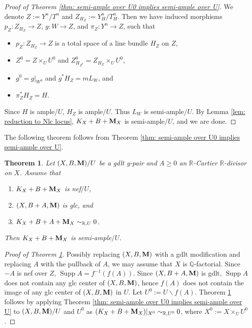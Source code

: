 \documentclass[11pt]{amsart}
\numberwithin{equation}{section}
\newcommand{\Mm}{{\bf{M}}}
\newcommand{\Rr}{\mathbb{R}}
\newcommand{\Supp}{\operatorname{Supp}}
\newtheorem{thm}{Theorem}[section]
\theoremstyle{definition}
\theoremstyle{definition}
\theoremstyle{definition}
\begin{document}
\begin{proof}[Proof of Theorem \ref{thm: semi-ample over U0 implies
  semi-ample over U}]
  We denote $Z:=Y^n/T^n$ and $Z_{H_Z}:=Y^n_H/T^n_H$. Then we have
  induced morphisms $p_Z: Z_{H_Z}\rightarrow Z$, $g: W\rightarrow Z$,
  and $\pi_Z: Y^n\rightarrow Z$, such that
  \begin{itemize}
    \item  $p_Z: Z_{H_Z}\rightarrow Z$ is a total space of a line
      bundle $H_Z$ on $Z$,
    \item $Z^0=Z\times_UU^0$ and $Z^0_{H_{Z^0}}=Z_{H_Z}\times_UU^0$,
    \item $g^0=g|_{W^0}$ and $g^*H_Z=mL_W$, and
    \item $\pi_Z^*H_Z=H$.
  \end{itemize}
  Since $H$ is ample$/U$, $H_Z$ is ample$/U$. Thus $L_W$ is
  semi-ample$/U$. By Lemma \ref{lem: reduction to Nlc locus},
  $K_X+B+\Mm_X$ is semi-ample$/U$, and we are done.
\end{proof}

The following theorem follows from Theorem \ref{thm: semi-ample over
U0 implies semi-ample over U}.

\begin{thm}\label{thm: nef imply semi-ample}
  Let $(X,B,\Mm)/U$ be a gdlt g-pair and $A\geq 0$ an $\mathbb
  R$-Cartier $\mathbb R$-divisor on $X$. Assume that
  \begin{enumerate}
    \item $K_X+B+\Mm_X$ is nef$/U$,
    \item $(X,B+A,\Mm)$ is glc, and
    \item $K_X+B+A+\Mm_X\sim_{\Rr,U}0$.
  \end{enumerate}
  Then $K_X+B+\Mm_X$ is semi-ample$/U$.
\end{thm}

\begin{proof}[Proof of Theorem \ref{thm: nef imply semi-ample}]
  Possibly replacing $(X,B,\Mm)$ with a gdlt modification and
  replacing $A$ with the pullback of $A$, we may assume that $X$ is
  $\mathbb Q$-factorial. Since $-A$ is nef over $Z$, $\Supp
  A=f^{-1}(f(A))$. Since $(X,B+A,\Mm)$ is gdlt, $\Supp A$ does not
  contain any glc center of $(X,B,\Mm)$, hence $f(A)$ does not
  contain the image of any glc center of $(X,B,\Mm)$ in $U$. Let
  $U^0:=U\backslash f(A)$. Theorem \ref{thm: nef imply semi-ample}
  follows by applying Theorem \ref{thm: semi-ample over U0 implies
  semi-ample over U} to $(X,B,\Mm)/U$ and $U^0$ as
  $(K_X+B+\Mm_X)|_{X^0}\sim_{\mathbb R,U^0}0$, where $X^0:=X\times_UU^0$.
\end{proof}
\end{document}
